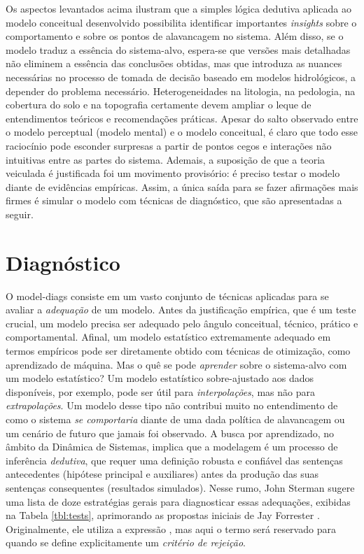 \documentclass[./main.tex]{subfiles}
\begin{document}
\par Os aspectos levantados acima ilustram que a simples lógica dedutiva aplicada ao modelo conceitual desenvolvido possibilita identificar importantes \textit{insights} sobre o comportamento e sobre os pontos de alavancagem no sistema. Além disso, se o modelo traduz a essência do sistema-alvo, espera-se que versões mais detalhadas não eliminem a essência das conclusões obtidas, mas que introduza as nuances necessárias no processo de tomada de decisão baseado em modelos hidrológicos, a depender do problema necessário. Heterogeneidades na litologia, na pedologia, na cobertura do solo e na topografia certamente devem ampliar o leque de entendimentos teóricos e recomendações práticas. Apesar do salto observado entre o modelo perceptual (modelo mental) e o modelo conceitual, é claro que todo esse raciocínio pode esconder surpresas a partir de pontos cegos e interações não intuitivas entre as partes do sistema. Ademais, a suposição de que a teoria veiculada é justificada foi um movimento provisório: é preciso testar o modelo diante de evidências empíricas. Assim, a única saída para se fazer afirmações mais firmes é simular o modelo com técnicas de diagnóstico, que são apresentadas a seguir.

\section{Diagnóstico} \label{sec:sys:diags}

\par O \gls{model-diags} consiste em um vasto conjunto de técnicas aplicadas para se avaliar a \textit{adequação} de um modelo. Antes da justificação empírica, que é um teste crucial, um modelo precisa ser adequado pelo ângulo conceitual, técnico, prático e comportamental. Afinal, um modelo estatístico extremamente adequado em termos empíricos pode ser diretamente obtido com técnicas de otimização, como aprendizado de máquina. Mas o quê se pode \textit{aprender} sobre o sistema-alvo com um modelo estatístico? Um modelo estatístico sobre-ajustado aos dados disponíveis, por exemplo, pode ser útil para \textit{interpolações}, mas não para \textit{extrapolações}. Um modelo desse tipo não contribui muito no entendimento de como o sistema \textit{se comportaria} diante de uma dada política de alavancagem ou um cenário de futuro que jamais foi observado. A busca por aprendizado, no âmbito da Dinâmica de Sistemas, implica que a modelagem é um processo de inferência \textit{dedutiva}, que requer uma definição robusta e confiável das sentenças antecedentes (hipótese principal e auxiliares) antes da produção das suas sentenças consequentes (resultados simulados). Nesse rumo, John Sterman sugere uma lista de doze estratégias gerais para diagnosticar essas adequações, exibidas na Tabela \ref{tbl:tests}, aprimorando as propostas iniciais de Jay Forrester \cite{sterman2000}. Originalmente, ele utiliza a expressão , mas aqui o termo  será reservado para quando se define explicitamente um \textit{critério de rejeição}. 
\end{document}
